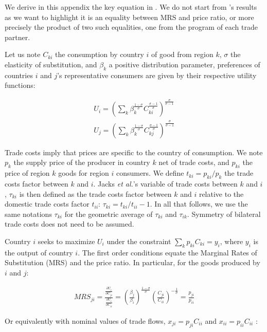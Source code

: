 \documentclass{article}
\begin{document}
We derive in this appendix the key equation in \cite{JMN2011}.
We do not start from \cite{AW2003}'s results as we want to
highlight it is an equality between MRS and price ratio, or
more precisely the product of two such equalities, one from the
program of each trade partner.

Let us note $C_{ki}$ the consumption by country $i$ of good from
region $k$, $\sigma$ the elasticity of substitution, and
$\beta_k$ a positive distribution parameter, preferences of
countries $i$ and $j$'s representative consumers are given by
their respective utility functions:

\begin{eqnarray*}
U_i=\left(\sum_k\beta_{k}^{\frac{1-\sigma}{\sigma}}C_{ki}^{\frac{\sigma-1}{\sigma}}\right)^{\frac{\sigma}{\sigma-1}}\\
U_j=\left(\sum_k\beta_{k}^{\frac{1-\sigma}{\sigma}}C_{kj}^{\frac{\sigma-1}{\sigma}}\right)^{\frac{\sigma}{\sigma-1}}
\end{eqnarray*}

Trade costs imply that prices are specific to the country of
consumption. We note $p_k$ the supply price of the producer in
country $k$ net of trade costs, and $p_{ki}$ the price of
region $k$ goods for region $i$ consumers. We define
$t_{ki}=p_{ki}/p_{k}$ the trade costs factor between $k$ and
$i$. Jacks \textit{et al.}'s variable of trade costs between $k$ and
$i$, $\tau_{ki}$ is then defined as the trade costs factor
between $k$ and $i$ relative to the domestic trade costs factor
$t_{ii}$: $\tau_{ki}=t_{ki}/t_{ii}-1$. In all that follows, we
use the same notations $\tau_{ki}$ for the geometric average of
$\tau_{ki}$ and $\tau_{ik}$. Symmetry of bilateral trade costs
does not need to be assumed.

Country $i$ seeks to maximize $U_i$ under the constraint
$\sum_k p_{ki} C_{ki}=y_i$, where $y_i$ is the output of
country $i$. The first order conditions equate the Marginal
Rates of Substitution (MRS) and the price ratio. In particular,
for the goods produced by $i$ and $j$:

\begin{eqnarray*}
MRS_{ji}=\frac{\frac{\partial U_i}{\partial C_{ji}}}{\frac{\partial
U_i}{\partial C_{ii}}}=
\left(\frac{\beta_j}{\beta_i}\right)^{\frac{1-\sigma}{\sigma}}\left(\frac{C_{ji}}{C_{ii}}\right)^{-\frac{1}{\sigma}}=\frac{p_{ji}}{p_{ii}}
\end{eqnarray*}

Or equivalently with nominal values of trade flows,
$x_{ji}=p_{ji}C_{ii}$ and $x_{ii}=p_{ii}C_{ii}$ :
\end{document}
